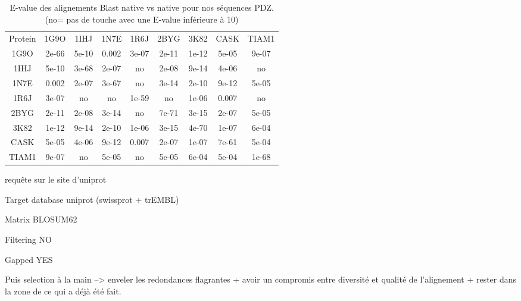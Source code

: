     \begin{table}[!htbp]
      \centering

      \begin{tabular}{ccccccccc}

        \toprule
        Protein & 1G9O & 1IHJ & 1N7E & 1R6J & 2BYG & 3K82 & CASK & TIAM1 \\
        \cmidrule{1-9}

        1G9O &  2e-66 & 5e-10 &  0.002 & 3e-07 & 2e-11 & 1e-12 & 5e-05 & 9e-07 \\     
        1IHJ &  5e-10 & 3e-68 &  2e-07 & no &   2e-08 & 9e-14 & 4e-06 & no    \\
        1N7E &  0.002 & 2e-07 &  3e-67 & no &    3e-14 & 2e-10 & 9e-12 & 5e-05 \\
        1R6J &  3e-07 & no  &    no  &  1e-59 &  no &   1e-06 & 0.007 & no    \\
        2BYG &  2e-11 & 2e-08 &  3e-14 & no &    7e-71 & 3e-15 & 2e-07 & 5e-05 \\
        3K82 &  1e-12 & 9e-14 &  2e-10 & 1e-06 & 3e-15 & 4e-70 & 1e-07 & 6e-04 \\
        CASK &  5e-05 & 4e-06 &  9e-12 & 0.007 & 2e-07 & 1e-07 & 7e-61 & 5e-04 \\
        TIAM1 & 9e-07 &  no &    5e-05 & no  &   5e-05 & 6e-04 & 5e-04 & 1e-68 \\
        \bottomrule


      \end{tabular}      
      \caption{E-value des alignements Blast native vs native pour nos séquences PDZ. (no= pas de touche avec une E-value inférieure à 10)}
\label{tab:Xblast}      
    \end{table}


requête sur le site d'uniprot

Target database uniprot (swissprot + trEMBL)

Matrix BLOSUM62

Filtering NO

Gapped YES


Puis selection à la main -->
enveler les redondances flagrantes
 + avoir un compromis entre diversité et qualité de l'alignement
 + rester dans la zone de ce qui a déjà été fait.



